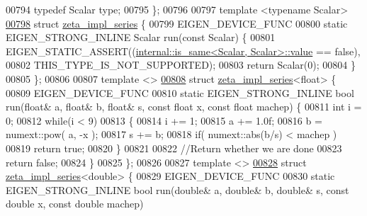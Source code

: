 \begin{DoxyCode}
00794     \textcolor{keyword}{typedef} Scalar type;
00795 \};
00796 
00797 \textcolor{keyword}{template} <\textcolor{keyword}{typename} Scalar>
\hyperlink{struct_eigen_1_1internal_1_1zeta__impl__series}{00798} \textcolor{keyword}{struct }\hyperlink{struct_eigen_1_1internal_1_1zeta__impl__series}{zeta\_impl\_series} \{
00799   EIGEN\_DEVICE\_FUNC
00800   \textcolor{keyword}{static} EIGEN\_STRONG\_INLINE Scalar run(\textcolor{keyword}{const} Scalar) \{
00801     EIGEN\_STATIC\_ASSERT((\hyperlink{struct_eigen_1_1internal_1_1is__same}{internal::is\_same<Scalar, Scalar>::value} 
      == \textcolor{keyword}{false}),
00802                         THIS\_TYPE\_IS\_NOT\_SUPPORTED);
00803     \textcolor{keywordflow}{return} Scalar(0);
00804   \}
00805 \};
00806 
00807 \textcolor{keyword}{template} <>
\hyperlink{struct_eigen_1_1internal_1_1zeta__impl__series_3_01float_01_4}{00808} \textcolor{keyword}{struct }\hyperlink{struct_eigen_1_1internal_1_1zeta__impl__series}{zeta\_impl\_series}<float> \{
00809   EIGEN\_DEVICE\_FUNC
00810   \textcolor{keyword}{static} EIGEN\_STRONG\_INLINE \textcolor{keywordtype}{bool} run(\textcolor{keywordtype}{float}& a, \textcolor{keywordtype}{float}& b, \textcolor{keywordtype}{float}& s, \textcolor{keyword}{const} \textcolor{keywordtype}{float} x, \textcolor{keyword}{const} \textcolor{keywordtype}{float} machep) \{
00811     \textcolor{keywordtype}{int} i = 0;
00812     \textcolor{keywordflow}{while}(i < 9)
00813     \{
00814         i += 1;
00815         a += 1.0f;
00816         b = numext::pow( a, -x );
00817         s += b;
00818         \textcolor{keywordflow}{if}( numext::abs(b/s) < machep )
00819             \textcolor{keywordflow}{return} \textcolor{keyword}{true};
00820     \}
00821 
00822     \textcolor{comment}{//Return whether we are done}
00823     \textcolor{keywordflow}{return} \textcolor{keyword}{false};
00824   \}
00825 \};
00826 
00827 \textcolor{keyword}{template} <>
\hyperlink{struct_eigen_1_1internal_1_1zeta__impl__series_3_01double_01_4}{00828} \textcolor{keyword}{struct }\hyperlink{struct_eigen_1_1internal_1_1zeta__impl__series}{zeta\_impl\_series}<double> \{
00829   EIGEN\_DEVICE\_FUNC
00830   \textcolor{keyword}{static} EIGEN\_STRONG\_INLINE \textcolor{keywordtype}{bool} run(\textcolor{keywordtype}{double}& a, \textcolor{keywordtype}{double}& b, \textcolor{keywordtype}{double}& s, \textcolor{keyword}{const} \textcolor{keywordtype}{double} x, \textcolor{keyword}{const} \textcolor{keywordtype}{double} machep)

\end{DoxyCode}
